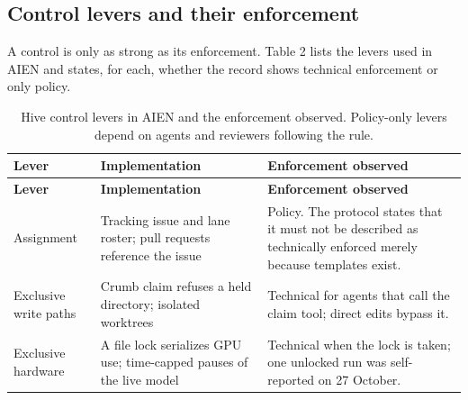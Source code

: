 \documentclass[11pt]{article}
\begin{document}
\subsection{Control levers and their enforcement}

A control is only as strong as its enforcement. Table 2 lists the levers used in AIEN and states, for each, whether the record shows technical enforcement or only policy.

\begin{longtable}[]{@{}
  >{\raggedright\arraybackslash}p{}
  >{\raggedright\arraybackslash}p{}
  >{\raggedright\arraybackslash}p{}@{}}
\caption{Hive control levers in AIEN and the enforcement observed. Policy-only levers depend on agents and reviewers following the rule.}\tabularnewline
\toprule\noalign{}
\begin{minipage}[b]{\linewidth}\raggedright
\textbf{Lever}
\end{minipage} & \begin{minipage}[b]{\linewidth}\raggedright
\textbf{Implementation}
\end{minipage} & \begin{minipage}[b]{\linewidth}\raggedright
\textbf{Enforcement observed}
\end{minipage} \\
\midrule\noalign{}
\endfirsthead
\toprule\noalign{}
\begin{minipage}[b]{\linewidth}\raggedright
\textbf{Lever}
\end{minipage} & \begin{minipage}[b]{\linewidth}\raggedright
\textbf{Implementation}
\end{minipage} & \begin{minipage}[b]{\linewidth}\raggedright
\textbf{Enforcement observed}
\end{minipage} \\
\midrule\noalign{}
\endhead
\bottomrule\noalign{}
\endlastfoot
Assignment & Tracking issue and lane roster; pull requests reference the issue \cite{issuefirst} & Policy. The protocol states that it must not be described as technically enforced merely because templates exist. \\
Exclusive write paths & Crumb claim refuses a held directory; isolated worktrees \cite{crumb} & Technical for agents that call the claim tool; direct edits bypass it. \\
Exclusive hardware & A file lock serializes GPU use; time-capped pauses of the live model \cite{oprecord} & Technical when the lock is taken; one unlocked run was self-reported on 27 October. \\

\end{longtable}
\end{document}

